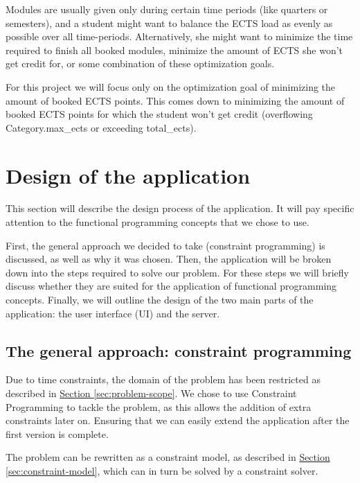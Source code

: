 \documentclass[a4paper]{article}
\begin{document}
Modules are usually given only during certain time periods (like quarters or semesters),
and a student might want to balance the ECTS load as evenly as possible over all time-periods.
Alternatively, she might want to minimize the time required to finish all booked modules, 
minimize the amount of ECTS she won't get credit for, 
or some combination of these optimization goals.

For this project we will focus only on the optimization goal of minimizing the amount of booked ECTS points.
This comes down to minimizing the amount of booked ECTS points for which the student won't get credit (overflowing Category.max\_ects or exceeding total\_ects).





\section{Design of the application}
\label{sec:design}
This section will describe the design process of the application.
It will pay specific attention to the functional programming concepts that we
chose to use.

First, the general approach we decided to take (constraint programming) is discussed,
as well as why it was chosen.
Then, the application will be broken down into the steps required to solve our problem.
For these steps we will briefly discuss whether they are suited for the application
of functional programming concepts.
Finally, we will outline the design of the two main parts of the application:
the user interface (UI) and the server.


\subsection{The general approach: constraint programming}
\label{sec:general-approach}
Due to time constraints, the domain of the problem has been restricted as described in
\hyperref[sec:problem-scope]{Section \ref*{sec:problem-scope}}.
We chose to use Constraint Programming to tackle the problem, 
as this allows the addition of extra constraints later on.
Ensuring that we can easily extend the application after the first version is complete.

The problem can be rewritten as a constraint model, as described in 
\hyperref[sec:constraint-model]{Section \ref*{sec:constraint-model}}, which can in turn be solved by a constraint solver.
\end{document}
